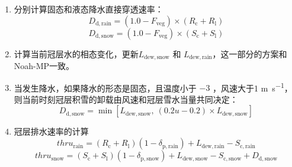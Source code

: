 \begin{enumerate}
  \item 分别计算固态和液态降水直接穿透速率：
    \begin{equation}
      D_{\mathrm{d,rain}}=\left(1.0-F_{\mathrm{veg}}\right) \times (R_{\mathrm{c}}+R_{\mathrm{l}})
    \end{equation}
    \begin{equation}
      D_{\mathrm{d,snow}}=\left(1.0-F_{\mathrm{veg}}\right) \times (S_{\mathrm{c}}+S_{\mathrm{l}})
    \end{equation}

  \item 计算当前冠层水的相态变化，更新$L_{\mathrm{dew,snow}}$ 和 $L_{\mathrm{dew,rain}}$，这一部分的方案和Noah-MP一致。

  \item 当发生降水，如果降水的形态是固态，且温度小于 $-3$ \textcelsius ，风速大于1 \unit{m.s^{-1}}，则当前时刻冠层积雪的卸载由风速和冠层雪水当量共同决定：
    \begin{equation}
      D_{\mathrm{d,snow}} = \min\left[L_{\mathrm{dew,snow}},\ (0.2u-0.2) \times L_{\mathrm{dew,snow}}\right]
    \end{equation}

  \item 冠层排水速率的计算
    \begin{equation}
      thru_{\mathrm{rain}}=\left(R_{\mathrm{c}}+R_{\mathrm{l}}\right)\left(1-\delta_{\mathrm{p,rain}}\right)+L_{\mathrm{dew,rain}}-S_{\mathrm{c,rain}}
    \end{equation}
    \begin{equation}
      thru_{\mathrm{snow}}=\left(S_{\mathrm{c}}+S_{\mathrm{l}}\right)\left(1-\delta_{\mathrm{p,snow}}\right)+L_{\mathrm{dew,snow}}-S_{\mathrm{c,snow}}+D_{\mathrm{d,snow}}
    \end{equation}


\end{enumerate}
